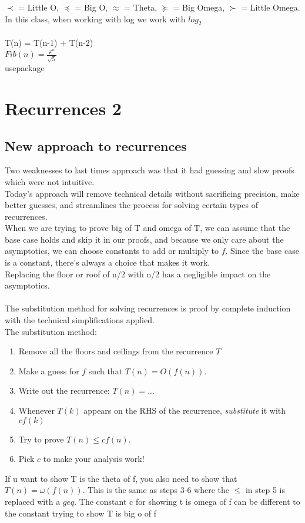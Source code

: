 \documentclass{article}
\begin{document}
$\prec$ = Little O, $\preceq$ = Big O, $\approx$ = Theta, $\succeq$ = Big Omega, $\succ $ = Little Omega.\\

 In this class, when working with log we work with $log_2$\\
\\
T(n) = T(n-1) + T(n-2)
\\
$Fib(n) = \frac{\varphi^n}{\sqrt{5}}$\\usepackage{}\\
\section{Recurrences 2}
\subsection{New approach to recurrences}
Two weaknesses to last times approach was that it had guessing and slow proofs which were not intuitive.\\
Today's approach will remove technical details without sacrificing precision, make better guesses, and streamlines the process for solving certain types of recurrences.\\
When we are trying to prove big of T and omega of T, we can assume that the base case holds and skip it in our proofs, and because we only care about the asymptotics, we can choose constants to add or multiply to $f$. Since the base case is a constant, there's always a choice that makes it work.\\
Replacing the floor or roof of n/2 with n/2 has a negligible impact on the asymptotics.\\ \\
The substitution method for solving recurrences is proof by complete induction with the technical simplifications applied. \\
The substitution method:
\begin{enumerate}
    \item Remove all the floors and ceilings from the recurrence $T$
    \item Make a guess for $f$ such that $T(n) = O(f(n))$.
    \item Write out the recurrence: $T(n) = ...$
    \item Whenever $T(k)$ appears on the RHS of the recurrence, \textit{substitute} it with $cf(k)$
    \item Try to prove $T(n) \leq cf(n)$.
    \item Pick $c$ to make your analysis work!
\end{enumerate}
If u want to show T is the theta of f, you also need to show that $T(n) = \omega (f(n))$. This is the same as steps 3-6 where the $\leq$ in step 5 is replaced with a $geq$. The constant c for showing t is omega of f can be different to the constant trying to show T is big o of f\\
\end{document}
